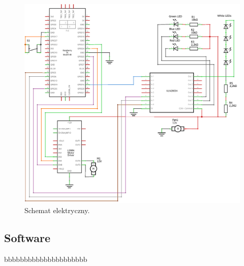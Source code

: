 \begin{figure}[H]
    \centering
    \includegraphics[width=0.95\linewidth]{chapters/03-praca-wlasna/figures/electronics circut_schem}
    \caption{\label{fig:electronics}Schemat elektryczny.}
\end{figure}

\subsection{Software}\label{subsec:software}
bbbbbbbbbbbbbbbbbbbbb